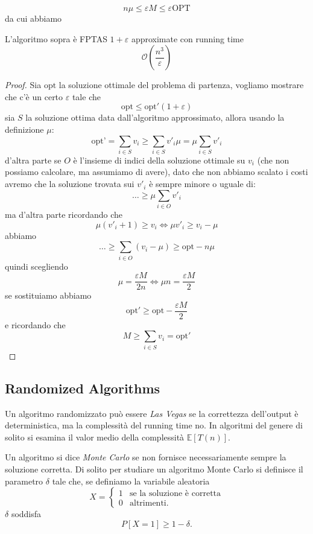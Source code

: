 \documentclass[11pt]{scrartcl}
\newcommand{\bigo}{\mathcal{O}}
\begin{document}
	$$n\mu\le \varepsilon M \le \varepsilon \text{OPT}$$
	da cui abbiamo 
	\begin{lemma}[Correctness]
		L'algoritmo sopra è FPTAS $1+\varepsilon$ approximate con running time 
		$$\bigo\left(\frac{n^3}{\varepsilon}\right)$$
	\end{lemma}
	\begin{proof}
		Sia $\text{opt}$ la soluzione ottimale del problema di partenza, vogliamo mostrare che c'è un certo $\varepsilon$ tale che 
		$$\text{opt}\le \text{opt}'(1+\varepsilon)$$
		sia $S$ la soluzione ottima data dall'algoritmo approssimato, allora usando la definizione $\mu$:
		$$\text{opt'}=\sum_{i\in S}v_i \ge \sum_{i\in S}v'_i\mu =\mu\sum_{i\in S}v'_i$$
		d'altra parte se $O$ è l'insieme di indici della soluzione ottimale su $v_i$ (che non possiamo calcolare, ma assumiamo di avere), dato che non abbiamo scalato i costi avremo che la soluzione trovata sui $v'_i$ è sempre minore o uguale di: 
		$$\dots \ge \mu\sum_{i\in O} v'_i$$ 
		ma d'altra parte ricordando che 
		$$\mu(v'_i+1)\ge v_i \iff \mu v'_i \ge v_i-\mu$$ 
		abbiamo
		$$\dots \ge \sum_{i\in O}(v_i-\mu)\ge \text{opt}-n\mu$$
		quindi scegliendo 
		$$\mu=\frac{\varepsilon M}{2n} \iff \mu n =\frac{\varepsilon M}{2}$$
		se sostituiamo abbiamo
		$$\text{opt}'\ge \text{opt}-\frac{\varepsilon M}{2}$$
		e ricordando che 
		$$M\ge \sum_{i\in S}v_i=\text{opt}'$$
	\end{proof}
	\subsection{Randomized Algorithms}
	\begin{definition}
		Un algoritmo randomizzato può essere \textit{Las Vegas} se la correttezza dell'output è deterministica, ma la complessità del running time no. In algoritmi del genere di solito si esamina il valor medio della complessità $\mathbb{E}\left[T(n)\right]$.
		
		Un algoritmo si dice \textit{Monte Carlo} se non fornisce necessariamente sempre la soluzione corretta. Di solito per studiare un algoritmo Monte Carlo si definisce il parametro $\delta$ tale che, se definiamo la variabile aleatoria
		$$X=\begin{cases}
			1 & \text{se la soluzione è corretta} \\
			0 & \text{altrimenti.}
		\end{cases}$$
		$\delta$ soddisfa
		$$P[X=1]\ge 1-\delta.$$
	\end{definition}
\end{document}
